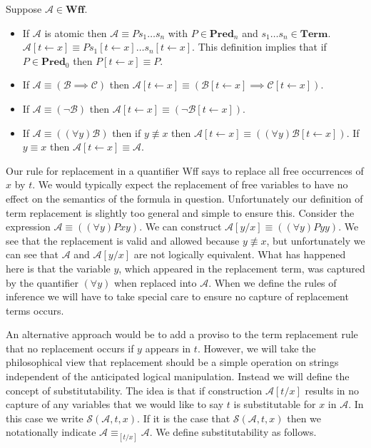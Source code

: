 \documentclass[12pt]{article}
\newcommand{\mc}[1]{\mathcal{#1}}
\begin{document}
Suppose $\mc{A}\in \textbf{Wff}$.
\begin{itemize}
\item{If $\mc{A}$ is atomic then $\mc{A}\equiv Ps_1\ldots s_n$ with $P\in \textbf{Pred}_n$ and $s_1\ldots s_n\in \textbf{Term}$. $\mc{A}[t\leftarrow x] \equiv Ps_1[t\leftarrow x]\ldots s_n[t\leftarrow x]$. This definition implies that if $P \in \textbf{Pred}_0$ then $P[t\leftarrow x] \equiv P$.}
\item{If $\mc{A} \equiv (\mc{B}\implies \mc{C})$ then $\mc{A}[t\leftarrow x] \equiv (\mc{B}[t\leftarrow x] \implies \mc{C}[t\leftarrow x])$.}
\item{If $\mc{A} \equiv (\lnot \mc{B})$ then $\mc{A}[t\leftarrow x] \equiv (\lnot \mc{B}[t\leftarrow x])$.}
\item{If $\mc{A} \equiv ((\forall y)\mc{B})$ then if $y\not \equiv x$ then $\mc{A}[t\leftarrow x] \equiv ((\forall y)\mc{B}[t\leftarrow x])$. If $y\equiv x$ then $\mc{A}[t\leftarrow x] \equiv \mc{A}$.}
\end{itemize}
\hrulefill

Our rule for replacement in a quantifier Wff says to replace all free occurrences of $x$ by $t$.
We would typically expect the replacement of free variables to have no effect on the semantics of the formula in question.
Unfortunately our definition of term replacement is slightly too general and simple to ensure this.
Consider the expression $\mc{A} \equiv ((\forall y)Pxy)$.
We can construct $\mc{A}[y/x] \equiv ((\forall y)Pyy)$.
We see that the replacement is valid and allowed because $y\not \equiv x$, but unfortunately we can see that $\mc{A}$ and $\mc{A}[y/x]$ are not logically equivalent.
What has happened here is that the variable $y$, which appeared in the replacement term, was captured by the quantifier $(\forall y)$ when replaced into $\mc{A}$.
When we define the rules of inference we will have to take special care to ensure no capture of replacement terms occurs.

An alternative approach would be to add a proviso to the term replacement rule that no replacement occurs if $y$ appears in $t$.
However, we will take the philosophical view that replacement should be a simple operation on strings independent of the anticipated logical manipulation.
Instead we will define the concept of substitutability.
The idea is that if construction $\mc{A}[t/x]$ results in no capture of any variables that we would like to say $t$ is substitutable for $x$ in $\mc{A}$.
In this case we write $\mc{S}(\mc{A}, t, x)$.
If it is the case that $\mc{S}(\mc{A}, t, x)$ then we notationally indicate $\mc{A} \equiv _{[t/x]}\mc{A}$.
We define substitutability as follows.
\end{document}
